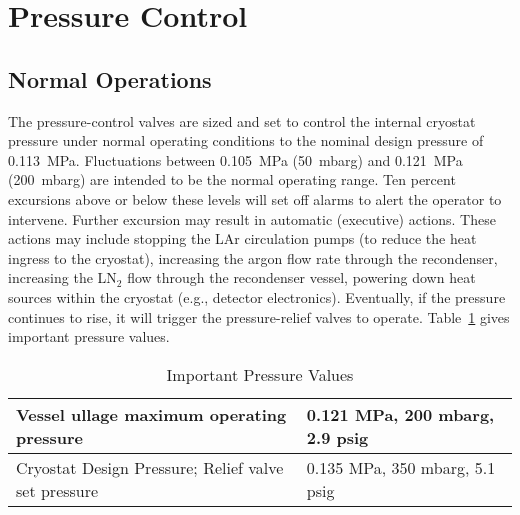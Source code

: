 
\section{Pressure Control}
\label{sec:press-control}

\subsection{Normal Operations}

The pressure-control valves are sized and set to control the 
internal cryostat pressure under normal operating conditions 
to the nominal design pressure of 0.113~MPa. Fluctuations 
between 0.105~MPa (50~mbarg) and 0.121~MPa (200~mbarg) are 
intended to be the normal operating range.
Ten percent excursions above or below these levels will set off 
alarms to alert the operator to intervene. Further excursion 
may result in automatic (executive) actions.  These actions may 
include stopping the LAr circulation pumps (to reduce the heat 
ingress to the cryostat), increasing the argon flow rate through 
the recondenser, increasing the LN$_2$ flow through the recondenser vessel, 
powering down heat sources within the cryostat (e.g., detector electronics).  
Eventually, if the pressure continues to rise, it will trigger the 
pressure-relief valves to operate. Table~\ref{table:pressure-values} 
gives important pressure values.

\begin{table}
\centering
\caption{Important Pressure Values}
\label{table:pressure-values}\begin{tabular}[htbp]{|l|l|}
\hline 
Vessel ullage maximum operating pressure & 0.121 MPa, 200 mbarg, 2.9 psig\\
\hline
Cryostat Design Pressure; Relief valve set pressure& 0.135 MPa, 350 mbarg, 5.1 psig\\
\hline
\end{tabular} 

\end{table}

